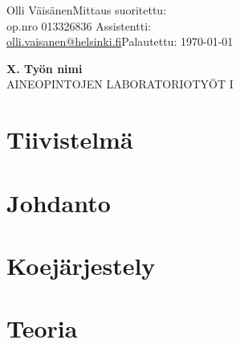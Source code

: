\documentclass[a4paper, twoside, 12pt]{artikel3} %
\makeatletter
\newcommand{\email}{\href{mailto:olli.vaisanen@helsinki.fi}{olli.vaisanen@helsinki.fi}} %
\makeatother
\begin{document}
\dmyyyydate %

%

\thispagestyle{empty} 
Olli Väisänen\hfill Mittaus suoritettu:  \\%
op.nro 013326836 \hfill Assistentti:  \\%
\email \hfill Palautettu: \today \\%
\vfill
\begin{center}
\textbf{\LARGE X. Työn nimi}\\ %
AINEOPINTOJEN LABORATORIOTYÖT I %
\end{center}
\vfill

\clearpage

\pagestyle{plain}

\section*{Tiivistelmä} 
	
\section{Johdanto}
	
\section{Koejärjestely}
	
\section{Teoria}
	
\end{document}
